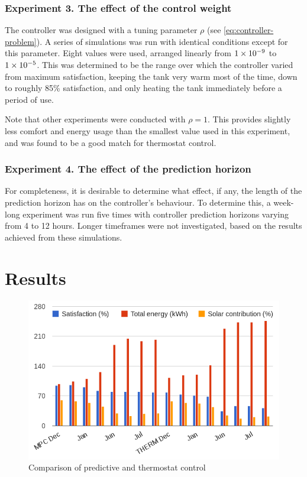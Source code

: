 \subsubsection{Experiment 3. The effect of the control weight}

The controller was designed with a tuning parameter $\rho$ (see \autoref{eq:controller-problem}).
A series of simulations was run with identical conditions except for this parameter.
Eight values were used, arranged linearly from $1\times 10^{-9}$ to $1\times 10^{-5}$.
This was determined to be the range over which the controller varied from maximum satisfaction, keeping the tank very warm most of the time, down to roughly 85\% satisfaction, and only heating the tank immediately before a period of use.

Note that other experiments were conducted with $\rho = 1$.
This provides slightly less comfort and energy usage than the smallest value used in this experiment, and was found to be a good match for thermostat control.

\subsubsection{Experiment 4. The effect of the prediction horizon}

For completeness, it is desirable to determine what effect, if any, the length of the prediction horizon has on the controller's behaviour.
To determine this, a week-long experiment was run five times with controller prediction horizons varying from 4 to 12 hours.
Longer timeframes were not investigated, based on the results achieved from these simulations.

\section{Results}

\begin{figure}
   \centering
   \includegraphics[width=\textwidth]{images/comparison}
   \caption{Comparison of predictive and thermostat control}
   \label{fig:comparison}
\end{figure}

